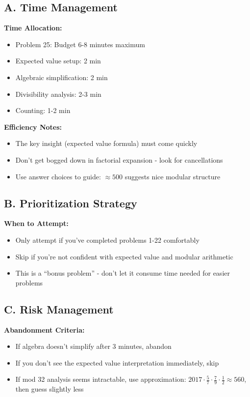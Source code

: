 \documentclass[]{article}
\begin{document}
	\begin{competitionbox}
		\subsection*{A. Time Management}
		
		\textbf{Time Allocation:}
		\begin{itemize}[nosep]
			\item Problem 25: Budget 6-8 minutes maximum
			\item Expected value setup: 2 min
			\item Algebraic simplification: 2 min
			\item Divisibility analysis: 2-3 min
			\item Counting: 1-2 min
		\end{itemize}
		
		\textbf{Efficiency Notes:}
		\begin{itemize}[nosep]
			\item The key insight (expected value formula) must come quickly
			\item Don't get bogged down in factorial expansion - look for cancellations
			\item Use answer choices to guide: $\approx 500$ suggests nice modular structure
		\end{itemize}
		
		\subsection*{B. Prioritization Strategy}
		
		\textbf{When to Attempt:}
		\begin{itemize}[nosep]
			\item Only attempt if you've completed problems 1-22 comfortably
			\item Skip if you're not confident with expected value and modular arithmetic
			\item This is a ``bonus problem'' - don't let it consume time needed for easier problems
		\end{itemize}
		
		\subsection*{C. Risk Management}
		
		\textbf{Abandonment Criteria:}
		\begin{itemize}[nosep]
			\item If algebra doesn't simplify after 3 minutes, abandon
			\item If you don't see the expected value interpretation immediately, skip
			\item If mod 32 analysis seems intractable, use approximation: $2017 \cdot \frac{5}{7} \cdot \frac{7}{9} \cdot \frac{1}{2} \approx 560$, then guess slightly less
		\end{itemize}
		

\end{competitionbox}
\end{document}
